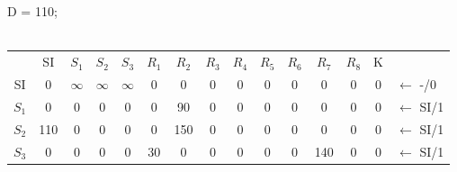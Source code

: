 \documentclass[12pt]{article}
\begin{document}
\begin{enumerate}
\begin{tabular}{|c|c|c|c|c|c|c|c|c|c|c|c|c|c|l}
\end{tabular}
\\
\\
D = 110;
\\
\\
\begin{tabular}{|c|c|c|c|c|c|c|c|c|c|c|c|c|c|l}
\cline{1-14}
      & SI  & $S_1$                           & $S_2$                           & $S_3$                           & $R_1$                      & $R_2$                      & $R_3$                      & $R_4$                     & $R_5$                      & $R_6$                      & $R_7$                      & $R_8$                      & K                          &                        \\ \cline{1-14}
SI    & 0   & {\color[HTML]{000000} $\infty$} & {\color[HTML]{000000} $\infty$} & {\color[HTML]{FE0000} $\infty$} & {\color[HTML]{000000} 0}   & {\color[HTML]{000000} 0}   & {\color[HTML]{000000} 0}   & {\color[HTML]{000000} 0}  & {\color[HTML]{000000} 0}   & {\color[HTML]{000000} 0}   & {\color[HTML]{000000} 0}   & {\color[HTML]{000000} 0}   & {\color[HTML]{000000} 0}   & ${\leftarrow}$ -/0     \\ \cline{1-14}
$S_1$ & 0   & {\color[HTML]{000000} 0}        & {\color[HTML]{000000} 0}        & {\color[HTML]{000000} 0}        & {\color[HTML]{000000} 0}   & {\color[HTML]{000000} 90}  & {\color[HTML]{000000} 0}   & {\color[HTML]{000000} 0}  & {\color[HTML]{000000} 0}   & {\color[HTML]{000000} 0}   & {\color[HTML]{000000} 0}   & {\color[HTML]{000000} 0}   & {\color[HTML]{000000} 0}   & ${\leftarrow}$ SI/1    \\ \cline{1-14}
$S_2$ & 110 & {\color[HTML]{000000} 0}        & {\color[HTML]{000000} 0}        & {\color[HTML]{000000} 0}        & {\color[HTML]{000000} 0}   & {\color[HTML]{000000} 150} & {\color[HTML]{000000} 0}   & {\color[HTML]{000000} 0}  & {\color[HTML]{000000} 0}   & {\color[HTML]{000000} 0}   & {\color[HTML]{000000} 0}   & {\color[HTML]{000000} 0}   & {\color[HTML]{000000} 0}   & ${\leftarrow}$ SI/1    \\ \cline{1-14}
$S_3$ & 0   & {\color[HTML]{000000} 0}        & {\color[HTML]{000000} 0}        & {\color[HTML]{000000} 0}        & {\color[HTML]{FE0000} 30}  & {\color[HTML]{000000} 0}   & {\color[HTML]{000000} 0}   & {\color[HTML]{000000} 0}  & {\color[HTML]{000000} 0}   & {\color[HTML]{000000} 0}   & {\color[HTML]{000000} 140} & {\color[HTML]{000000} 0}   & {\color[HTML]{000000} 0}   & ${\leftarrow}$ SI/1    \\ \cline{1-14}

\end{tabular}
\end{enumerate}
\end{document}
